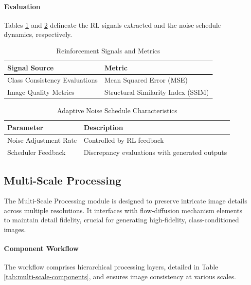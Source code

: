 \documentclass{article} %
\begin{document}
\paragraph{Evaluation}
Tables \ref{tab:ral-reinforcement-signals} and \ref{tab:ral-noise-schedule} delineate the RL signals extracted and the noise schedule dynamics, respectively.

\begin{table}[!ht]
\centering
\label{tab:ral-reinforcement-signals}
\begin{tabular}{|l|l|}
\hline
\textbf{Signal Source} & \textbf{Metric} \\ \hline
Class Consistency Evaluations & Mean Squared Error (MSE) \\ \hline
Image Quality Metrics & Structural Similarity Index (SSIM) \\ \hline
\end{tabular}
\caption{Reinforcement Signals and Metrics}
\end{table}

\begin{table}[!ht]
\centering
\label{tab:ral-noise-schedule}
\begin{tabular}{|l|l|}
\hline
\textbf{Parameter} & \textbf{Description} \\ \hline
Noise Adjustment Rate & Controlled by RL feedback \\ \hline
Scheduler Feedback & Discrepancy evaluations with generated outputs \\ \hline
\end{tabular}
\caption{Adaptive Noise Schedule Characteristics}
\end{table}

\subsection{Multi-Scale Processing}

The Multi-Scale Processing module is designed to preserve intricate image details across multiple resolutions. It interfaces with flow-diffusion mechanism elements to maintain detail fidelity, crucial for generating high-fidelity, class-conditioned images.

\paragraph{Component Workflow}
The workflow comprises hierarchical processing layers, detailed in Table \ref{tab:multi-scale-components}, and ensures image consistency at various scales.
\end{document}
